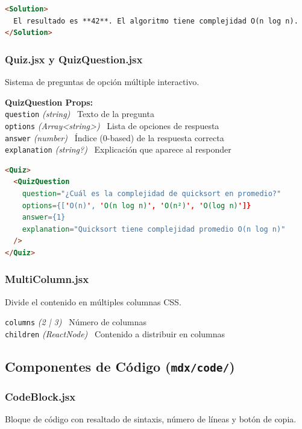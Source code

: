 \documentclass[12pt,a4paper]{article}
\newcommand{\prop}[3]{%
  \texttt{#1} \textit{(#2)} \textemdash\ #3\\%
}
\begin{document}
\begin{lstlisting}[language=HTML]
<Solution>
  El resultado es **42**. El algoritmo tiene complejidad O(n log n).
</Solution>
\end{lstlisting}

\subsubsection{Quiz.jsx y QuizQuestion.jsx}

Sistema de preguntas de opción múltiple interactivo.

\begin{mdframed}[style=propbox]
\textbf{QuizQuestion Props:}\\
\prop{question}{string}{Texto de la pregunta}
\prop{options}{Array\textless string\textgreater}{Lista de opciones de respuesta}
\prop{answer}{number}{Índice (0-based) de la respuesta correcta}
\prop{explanation}{string?}{Explicación que aparece al responder}
\end{mdframed}

\begin{lstlisting}[language=HTML]
<Quiz>
  <QuizQuestion
    question="¿Cuál es la complejidad de quicksort en promedio?"
    options={['O(n)', 'O(n log n)', 'O(n²)', 'O(log n)']}
    answer={1}
    explanation="Quicksort tiene complejidad promedio O(n log n)"
  />
</Quiz>
\end{lstlisting}

\subsubsection{MultiColumn.jsx}

Divide el contenido en múltiples columnas CSS.

\begin{mdframed}[style=propbox]
\prop{columns}{2 | 3}{Número de columnas}
\prop{children}{ReactNode}{Contenido a distribuir en columnas}
\end{mdframed}

\subsection{Componentes de Código (\texttt{mdx/code/})}

\subsubsection{CodeBlock.jsx}

Bloque de código con resaltado de sintaxis, número de líneas y botón de copia.
\end{document}
